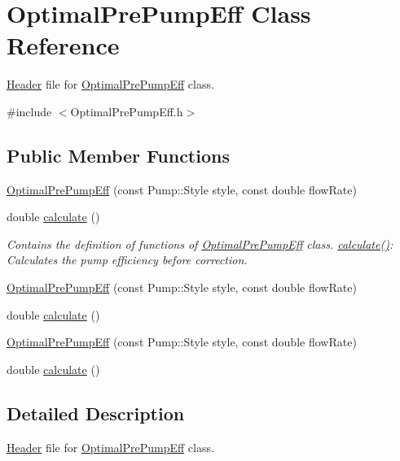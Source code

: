 \hypertarget{class_optimal_pre_pump_eff}{}\section{Optimal\+Pre\+Pump\+Eff Class Reference}
\label{class_optimal_pre_pump_eff}


\hyperlink{class_header}{Header} file for \hyperlink{class_optimal_pre_pump_eff}{Optimal\+Pre\+Pump\+Eff} class.  




{\ttfamily \#include $<$Optimal\+Pre\+Pump\+Eff.\+h$>$}

\subsection*{Public Member Functions}
\begin{DoxyCompactItemize}
\item 
\hyperlink{class_optimal_pre_pump_eff_acd025ad710fbc57a548ae3343752ad6d}{Optimal\+Pre\+Pump\+Eff} (const Pump\+::\+Style style, const double flow\+Rate)
\item 
double \hyperlink{class_optimal_pre_pump_eff_a7ced63984a89975c4f8f54642701d841}{calculate} ()
\begin{DoxyCompactList}\small\item\em Contains the definition of functions of \hyperlink{class_optimal_pre_pump_eff}{Optimal\+Pre\+Pump\+Eff} class. \hyperlink{class_optimal_pre_pump_eff_a7ced63984a89975c4f8f54642701d841}{calculate()}\+: Calculates the pump efficiency before correction. \end{DoxyCompactList}\item 
\hyperlink{class_optimal_pre_pump_eff_acd025ad710fbc57a548ae3343752ad6d}{Optimal\+Pre\+Pump\+Eff} (const Pump\+::\+Style style, const double flow\+Rate)
\item 
double \hyperlink{class_optimal_pre_pump_eff_a7ced63984a89975c4f8f54642701d841}{calculate} ()
\item 
\hyperlink{class_optimal_pre_pump_eff_acd025ad710fbc57a548ae3343752ad6d}{Optimal\+Pre\+Pump\+Eff} (const Pump\+::\+Style style, const double flow\+Rate)
\item 
double \hyperlink{class_optimal_pre_pump_eff_a7ced63984a89975c4f8f54642701d841}{calculate} ()
\end{DoxyCompactItemize}


\subsection{Detailed Description}
\hyperlink{class_header}{Header} file for \hyperlink{class_optimal_pre_pump_eff}{Optimal\+Pre\+Pump\+Eff} class. 

